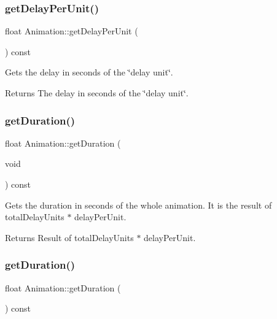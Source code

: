 \subsubsection{\texorpdfstring{get\+Delay\+Per\+Unit()}{getDelayPerUnit()}\hspace{0.1cm}{\footnotesize\ttfamily [2/2]}}
{\footnotesize\ttfamily float Animation\+::get\+Delay\+Per\+Unit (\begin{DoxyParamCaption}{ }\end{DoxyParamCaption}) const\hspace{0.3cm}{\ttfamily [inline]}}

Gets the delay in seconds of the \char`\"{}delay unit\char`\"{}.

\begin{DoxyReturn}{Returns}
The delay in seconds of the \char`\"{}delay unit\char`\"{}. 
\end{DoxyReturn}
\mbox{\label{classAnimation_aa2cd2d5b8e2e6a8d6a2366556e29b03f}} 
\subsubsection{\texorpdfstring{get\+Duration()}{getDuration()}\hspace{0.1cm}{\footnotesize\ttfamily [1/2]}}
{\footnotesize\ttfamily float Animation\+::get\+Duration (\begin{DoxyParamCaption}\item[{void}]{ }\end{DoxyParamCaption}) const}

Gets the duration in seconds of the whole animation. It is the result of total\+Delay\+Units $\ast$ delay\+Per\+Unit.

\begin{DoxyReturn}{Returns}
Result of total\+Delay\+Units $\ast$ delay\+Per\+Unit. 
\end{DoxyReturn}
\mbox{\label{classAnimation_aa2cd2d5b8e2e6a8d6a2366556e29b03f}} 
\subsubsection{\texorpdfstring{get\+Duration()}{getDuration()}\hspace{0.1cm}{\footnotesize\ttfamily [2/2]}}
{\footnotesize\ttfamily float Animation\+::get\+Duration (\begin{DoxyParamCaption}{ }\end{DoxyParamCaption}) const}


